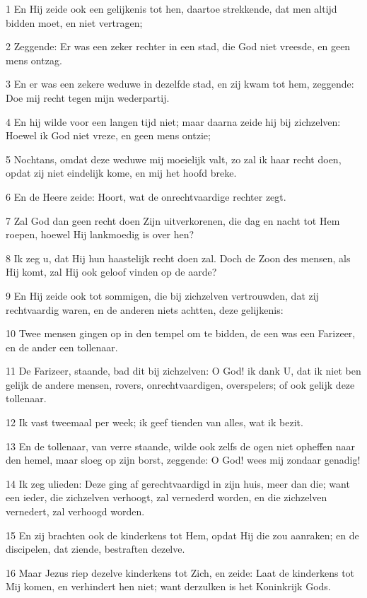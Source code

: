 \par 1 En Hij zeide ook een gelijkenis tot hen, daartoe strekkende, dat men altijd bidden moet, en niet vertragen;
\par 2 Zeggende: Er was een zeker rechter in een stad, die God niet vreesde, en geen mens ontzag.
\par 3 En er was een zekere weduwe in dezelfde stad, en zij kwam tot hem, zeggende: Doe mij recht tegen mijn wederpartij.
\par 4 En hij wilde voor een langen tijd niet; maar daarna zeide hij bij zichzelven: Hoewel ik God niet vreze, en geen mens ontzie;
\par 5 Nochtans, omdat deze weduwe mij moeielijk valt, zo zal ik haar recht doen, opdat zij niet eindelijk kome, en mij het hoofd breke.
\par 6 En de Heere zeide: Hoort, wat de onrechtvaardige rechter zegt.
\par 7 Zal God dan geen recht doen Zijn uitverkorenen, die dag en nacht tot Hem roepen, hoewel Hij lankmoedig is over hen?
\par 8 Ik zeg u, dat Hij hun haastelijk recht doen zal. Doch de Zoon des mensen, als Hij komt, zal Hij ook geloof vinden op de aarde?
\par 9 En Hij zeide ook tot sommigen, die bij zichzelven vertrouwden, dat zij rechtvaardig waren, en de anderen niets achtten, deze gelijkenis:
\par 10 Twee mensen gingen op in den tempel om te bidden, de een was een Farizeer, en de ander een tollenaar.
\par 11 De Farizeer, staande, bad dit bij zichzelven: O God! ik dank U, dat ik niet ben gelijk de andere mensen, rovers, onrechtvaardigen, overspelers; of ook gelijk deze tollenaar.
\par 12 Ik vast tweemaal per week; ik geef tienden van alles, wat ik bezit.
\par 13 En de tollenaar, van verre staande, wilde ook zelfs de ogen niet opheffen naar den hemel, maar sloeg op zijn borst, zeggende: O God! wees mij zondaar genadig!
\par 14 Ik zeg ulieden: Deze ging af gerechtvaardigd in zijn huis, meer dan die; want een ieder, die zichzelven verhoogt, zal vernederd worden, en die zichzelven vernedert, zal verhoogd worden.
\par 15 En zij brachten ook de kinderkens tot Hem, opdat Hij die zou aanraken; en de discipelen, dat ziende, bestraften dezelve.
\par 16 Maar Jezus riep dezelve kinderkens tot Zich, en zeide: Laat de kinderkens tot Mij komen, en verhindert hen niet; want derzulken is het Koninkrijk Gods.
